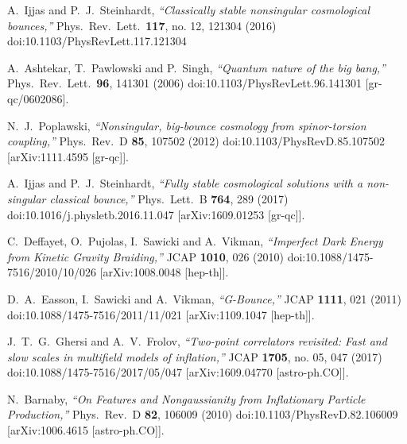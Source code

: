 \documentclass[aps,prd,reprint,twocolumn,showpacs,nofootinbib,superscriptaddress,floatfix]{revtex4-1}
\begin{document}
\begin{thebibliography}{99}

  A.~Ijjas and P.~J.~Steinhardt,
  \textit{``Classically stable nonsingular cosmological bounces,''}
  Phys.\ Rev.\ Lett.\  {\bf 117}, no. 12, 121304 (2016)
  doi:10.1103/PhysRevLett.117.121304

  A.~Ashtekar, T.~Pawlowski and P.~Singh,
  \textit{``Quantum nature of the big bang,''}
  Phys.\ Rev.\ Lett.\  {\bf 96}, 141301 (2006)
  doi:10.1103/PhysRevLett.96.141301
  [gr-qc/0602086].
  
  N.~J.~Poplawski,
  \textit{``Nonsingular, big-bounce cosmology from spinor-torsion coupling,''}
  Phys.\ Rev.\ D {\bf 85}, 107502 (2012)
  doi:10.1103/PhysRevD.85.107502
  [arXiv:1111.4595 [gr-qc]].
  
  A.~Ijjas and P.~J.~Steinhardt,
  \textit{``Fully stable cosmological solutions with a non-singular classical bounce,''}
  Phys.\ Lett.\ B {\bf 764}, 289 (2017)
  doi:10.1016/j.physletb.2016.11.047
  [arXiv:1609.01253 [gr-qc]].
  
  C.~Deffayet, O.~Pujolas, I.~Sawicki and A.~Vikman,
  \textit{``Imperfect Dark Energy from Kinetic Gravity Braiding,''}
  JCAP {\bf 1010}, 026 (2010)
  doi:10.1088/1475-7516/2010/10/026
  [arXiv:1008.0048 [hep-th]].
  
  D.~A.~Easson, I.~Sawicki and A.~Vikman,
 \textit{``G-Bounce,''}
  JCAP {\bf 1111}, 021 (2011)
  doi:10.1088/1475-7516/2011/11/021
  [arXiv:1109.1047 [hep-th]].
  
  
  J.~T.~G.~Ghersi and A.~V.~Frolov,
  \textit{``Two-point correlators revisited: Fast and slow scales in multifield models of inflation,''}
  JCAP {\bf 1705}, no. 05, 047 (2017)
  doi:10.1088/1475-7516/2017/05/047
  [arXiv:1609.04770 [astro-ph.CO]].
  
  N.~Barnaby,
  \textit{``On Features and Nongaussianity from Inflationary Particle Production,''}
  Phys.\ Rev.\ D {\bf 82}, 106009 (2010)
  doi:10.1103/PhysRevD.82.106009
  [arXiv:1006.4615 [astro-ph.CO]].

\end{thebibliography}
\end{document}
